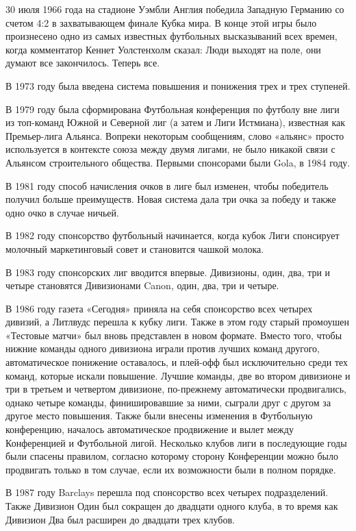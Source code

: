 30 июля 1966 года на стадионе Уэмбли Англия победила Западную Германию со счетом 4:2 в захватывающем финале Кубка мира. В конце этой игры было произнесено одно из самых известных футбольных высказываний всех времен, когда комментатор Кеннет Уолстенхолм сказал: Люди выходят на поле, они думают все закончилось. Теперь все.

В 1973 году была введена система повышения и понижения трех и трех ступеней.

В 1979 году была сформирована Футбольная конференция по футболу вне лиги из топ-команд Южной и Северной лиг (а затем и Лиги Истмиана), известная как Премьер-лига Альянса. Вопреки некоторым сообщениям, слово «альянс» просто используется в контексте союза между двумя лигами, не было никакой связи с Альянсом строительного общества. Первыми спонсорами были Gola, в 1984 году.

В 1981 году способ начисления очков в лиге был изменен, чтобы победитель получил больше преимуществ. Новая система дала три очка за победу и также одно очко в случае ничьей.

В 1982 году спонсорство футбольный начинается, когда кубок Лиги спонсирует молочный маркетинговый совет и становится чашкой молока.

В 1983 году спонсорских лиг вводится впервые. Дивизионы, один, два, три и четыре становятся Дивизионами Canon, один, два, три и четыре.

В 1986 году газета «Сегодня» приняла на себя спонсорство всех четырех дивизий, а Литлвудс перешла к кубку лиги. Также в этом году старый промоушен «Тестовые матчи» был вновь представлен в новом формате. Вместо того, чтобы нижние команды одного дивизиона играли против лучших команд другого, автоматическое понижение оставалось, и плей-офф был исключительно среди тех команд, которые искали повышение. Лучшие команды, две во втором дивизионе и три в третьем и четвертом дивизионе, по-прежнему автоматически продвигались, однако четыре команды, финишировавшие за ними, сыграли друг с другом за другое место повышения. Также были внесены изменения в Футбольную конференцию, началось автоматическое продвижение и вылет между Конференцией и Футбольной лигой. Несколько клубов лиги в последующие годы были спасены правилом, согласно которому сторону Конференции можно было продвигать только в том случае, если их возможности были в полном порядке.

В 1987 году Barclays перешла под спонсорство всех четырех подразделений. Также Дивизион Один был сокращен до двадцати одного клуба, в то время как Дивизион Два был расширен до двадцати трех клубов.

